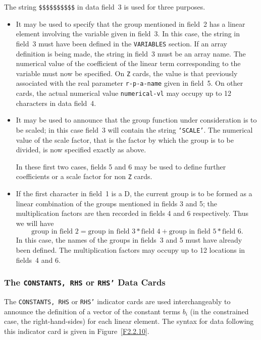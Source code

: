 \documentclass[a4paper]{article}
\begin{document}
The string {\tt \$\$\$\$\$\$\$\$\$\$}  in  data  field~3 is  used  for
three purposes.
\begin{itemize}
\item
It may be used to specify  that  the group  mentioned in field~2 has a
linear element
involving the variable given in field~3.  In this case,
the string in field~3 must  have been defined  in the {\tt  VARIABLES}
section.  If an array definition is being made, the string  in field~3
must be an array name.
The numerical  value of the coefficient of the
linear term corresponding  to the variable must  now be specified.  On
{\tt Z} cards,
the value  is that previously  associated with the real
parameter
{\tt r-p-a-name}  given in field~5.   On other cards, the
actual numerical  value {\tt  numerical-vl}  may occupy  up   to   12
characters in data field~4.

\item
It may be used to announce that 
the group function under consideration is to be scaled;  
in this case field~3  will contain the   string  {\tt `SCALE'}.
The numerical value of the scale factor,  that is the  factor by which
the group is to be divided, is now specified exactly as above.

In these first two cases, fields 5 and 6 may be used to define further
coefficients or a scale factor for non {\tt Z} cards.

\item
If the first character in field~1 is a D,  the current  group is to be
formed as a linear combination of the groups mentioned in fields 3 and
5;  the multiplication  factors are  then recorded in  fields  4 and 6
respectively. Thus we will have
\[
\mbox{group in field~2} = \mbox{group in field~3} * \mbox{field~4} +
                          \mbox{group in field~5} * \mbox{field~6}.
\]
In this case,  the names of the groups  in  fields~3  and 5  must have
already been defined.  The multiplication factors may occupy up  to 12
locations in fields~4 and 6.
\end{itemize}

\subsubsection{\label{S2.2.10}The {\tt CONSTANTS, RHS} or {\tt RHS'}
Data Cards}

The  {\tt CONSTANTS, RHS}  or   {\tt RHS'}  indicator  cards
are  used
interchangeably to announce the definition of a vector of the constant
terms $b_i$ (in the constrained  case, the right-hand-sides) for  each
linear element.
The syntax for data following this indicator  card is
given in Figure~\ref{F2.2.10}.
\end{document}

